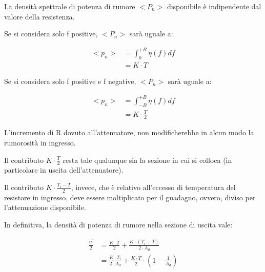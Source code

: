 La densità spettrale di potenza di rumore $<P_n>$ disponibile è indipendente dal valore della resistenza. \newline  

Se si considera solo f positive, $<P_n>$ sarà uguale a: 

{
    \Large 
    \begin{equation}
        \begin{split}
            <p_n> 
            &= 
            \int_{0}^{+B} \eta(f) df 
            \\
            &= 
            K \cdot T
        \end{split}
    \end{equation}
}

Se si considera solo f positive e f negative, $<P_n>$ sarà uguale a: 

{
    \Large 
    \begin{equation}
        \begin{split}
            <p_n> 
            &= 
            \int_{-B}^{+B} \eta(f) df 
            \\
            &= 
            K \cdot \frac{T}{2}
        \end{split}
    \end{equation}
}

L'incremento di R dovuto all'attenuatore, non modificherebbe in alcun modo la rumorosità in ingresso. \newline 

Il contributo $ K \cdot \frac{T}{2}$ resta tale qualunque sia la sezione in cui si colloca (in particolare in uscita dell'attenuatore). \newline 

Il contributo $ K \cdot \frac{T_i - T}{2}$, invece, che è relativo all'eccesso di temperatura del resistore in ingresso, 
deve essere moltiplicato per il guadagno, 
ovvero, diviso per l'attenuazione disponibile. \newline 

In definitiva, la densità di potenza di rumore nella sezione di uscita vale: 

{
    \Large 
    \begin{equation}
        \begin{split}
            \frac{\eta^{'}}{2}
            &= 
            \frac{K \cdot T}{2}
            +
            \frac{K \cdot (T_i - T)}{2 \cdot A_d}
            \\
            &= 
            \frac{K \cdot T_i}{2 \cdot A_d}
            + 
            \frac{K \cdot T}{2}
            \cdot 
            \left( 1 - \frac{1}{A_d}\right)
        \end{split}
    \end{equation}
}

